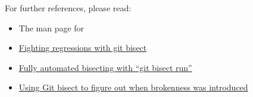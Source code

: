 \documentclass[a4paper,8pt,english]{sphinxmanual}
\begin{document}
For further references, please read:
\begin{itemize}
\item {} 
The man page for 

\item {} 
\href{https://www.kernel.org/pub/software/scm/git/docs/git-bisect-lk2009.html}{Fighting regressions with git bisect}

\item {} 
\href{https://lwn.net/Articles/317154}{Fully automated bisecting with ``git bisect run''}

\item {} 
\href{http://webchick.net/node/99}{Using Git bisect to figure out when brokenness was introduced}

\end{itemize}
\end{document}
